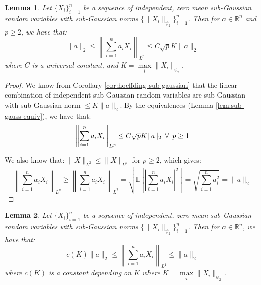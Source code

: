 \documentclass{article}
\newtheorem{lemma}{Lemma}[subsection]
\theoremstyle{remark}
\newcommand{\real}{\mathbb{R}}
\newcommand{\Exp}{\mathbb{E}}
\begin{document}
\begin{lemma}
\label{lem:khintchine-p-geq-2}
Let \(\{X_{i}\}_{i=1}^{n}\) be a sequence of independent, zero mean sub-Gaussian random variables with sub-Gaussian norms \(\{\|X_{i}\|_{\psi_{2}}\}_{i=1}^{n}\). Then for \(a \in \real^{n}\) and \(p \geq 2\), we have that:
\begin{equation*}
\|a\|_{2} \leq \left\|\sum_{i=1}^{n} a_{i}X_{i}\right\|_{L^{p}} \leq C\sqrt{p}K\|a\|_{2}
\end{equation*}
where \(C\) is a universal constant, and \(K = \max\limits_{i} \|X_{i}\|_{\psi_{2}}\).
\end{lemma}

\begin{proof}
We know from Corollary \ref{cor:hoeffding-sub-gaussian} that the linear combination of independent sub-Gaussian random variables are sub-Gaussian with sub-Gaussian norm \(\leq K\|a\|_{2}\). By the equivalences (Lemma \ref{lem:sub-gauss-equiv}), we have that:
\begin{equation*}
\left\|\sum_{i=1}^{n} a_{i}X_{i}\right\|_{L^{p}} \leq C \sqrt{p} K\|a\|_{2} \enskip \forall \enskip p \geq 1
\end{equation*}

We also know that: \(\|X\|_{L^{2}} \leq \|X\|_{L^{p}}\) for \(p \geq 2\), which gives:
\begin{equation*}
\left\|\sum_{i=1}^{n} a_{i}X_{i}\right\|_{L^{p}} \geq \left\|\sum_{i=1}^{n} a_{i}X_{i}\right\|_{L^{2}} = \sqrt{\Exp\left[\left|\sum_{i=1}^{n}a_{i}X_{i}\right|^{2}\right]} = \sqrt{\sum_{i=1}^{n}a_{i}^{2}} = \|a\|_{2}
\end{equation*}
\end{proof}

\begin{lemma}
\label{lem:khintchine-p-1}
Let \(\{X_{i}\}_{i=1}^{n}\) be a sequence of independent, zero mean sub-Gaussian random variables with sub-Gaussian norms \(\{\|X_{i}\|_{\psi_{2}}\}_{i=1}^{n}\). Then for \(a \in \real^{n}\), we have that:
\begin{equation*}
c(K)\|a\|_{2} \leq \left\|\sum_{i=1}^{n} a_{i}X_{i}\right\|_{L^{1}} \leq \|a\|_{2}
\end{equation*}
where \(c(K)\) is a constant depending on \(K\) where \(K = \max\limits_{i} \|X_{i}\|_{\psi_{2}}\).
\end{lemma}
\end{document}
